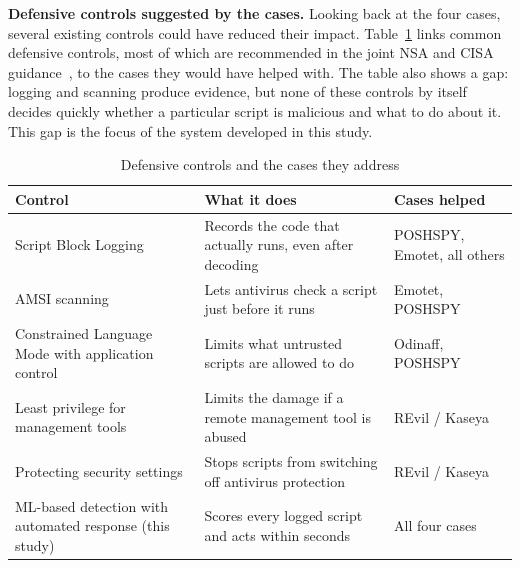 \documentclass[12pt,a4paper]{article}
\newcommand{\head}[1]{\noindent\textbf{#1}\quad}
\begin{document}
\head{Defensive controls suggested by the cases.} Looking back at the four cases, several existing controls could have reduced their impact. Table~\ref{tab:controls} links common defensive controls, most of which are recommended in the joint NSA and CISA guidance~\cite{nsa2022}, to the cases they would have helped with. The table also shows a gap: logging and scanning produce evidence, but none of these controls by itself decides quickly whether a particular script is malicious and what to do about it. This gap is the focus of the system developed in this study.

\begin{table}[htbp]
\centering
\caption{Defensive controls and the cases they address}\label{tab:controls}
\begin{tabularx}{\textwidth}{>{\raggedright\arraybackslash}p{4.4cm} >{\raggedright\arraybackslash}X >{\raggedright\arraybackslash}p{3.4cm}}
\toprule
\textbf{Control} & \textbf{What it does} & \textbf{Cases helped}\\
\midrule
Script Block Logging~\cite{ms_logging} & Records the code that actually runs, even after decoding & POSHSPY, Emotet, all others\\
AMSI scanning~\cite{ms_amsi} & Lets antivirus check a script just before it runs & Emotet, POSHSPY\\
Constrained Language Mode with application control~\cite{nsa2022} & Limits what untrusted scripts are allowed to do & Odinaff, POSHSPY\\
Least privilege for management tools & Limits the damage if a remote management tool is abused & REvil / Kaseya\\
Protecting security settings & Stops scripts from switching off antivirus protection & REvil / Kaseya\\
ML-based detection with automated response (this study) & Scores every logged script and acts within seconds & All four cases\\
\bottomrule
\end{tabularx}
\end{table}
\end{document}
